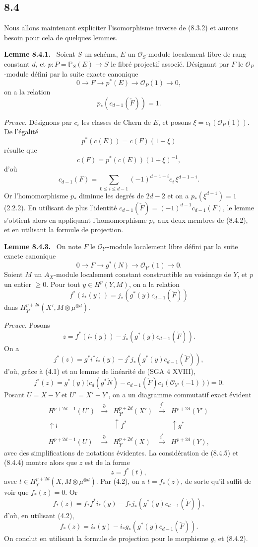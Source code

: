 \documentclass[11pt]{article}
\newenvironment{statement}[1]{\par\medskip\noindent\textbf{#1.}\ }{\par\medskip}
\begin{document}
\subsection*{8.4}

Nous allons maintenant expliciter l'isomorphisme inverse de (8.3.2) et aurons besoin pour cela de quelques lemmes.

\begin{statement}{Lemme 8.4.1}
Soient $S$ un schéma, $E$ un $\mathcal O_S$-module localement libre de rang constant $d$, et $p:P=\mathbb P_S(E)\to S$ le fibré projectif associé. Désignant par $F$ le $\mathcal O_P$-module défini par la suite exacte canonique
\[
0\to F\to p^*(E)\to\mathcal O_P(1)\to0,
\]
on a la relation
\[
p_*(c_{d-1}(\check F))=1.
\]
\end{statement}

\emph{Preuve.} Désignons par $c_i$ les classes de Chern de $E$, et posons $\xi=c_1(\mathcal O_P(1))$. De l'égalité
\[
p^*(c(E))=c(F)(1+\xi)
\]
résulte que
\[
c(F)=p^*(c(E))(1+\xi)^{-1},
\]
d'où
\[
c_{d-1}(F)=\sum_{0\le i\le d-1}(-1)^{d-1-i}c_i\,\xi^{d-1-i}.
\tag{8.4.2}
\]
Or l'homomorphisme $p_*$ diminue les degrés de $2d-2$ et on a $p_*(\xi^{d-1})=1$ (2.2.2). En utilisant de plus l'identité $c_{d-1}(\check F)=(-1)^{d-1}c_{d-1}(F)$, le lemme s'obtient alors en appliquant l'homomorphisme $p_*$ aux deux membres de (8.4.2), et en utilisant la formule de projection.

\begin{statement}{Lemme 8.4.3}
On note $F$ le $\mathcal O_{Y'}$-module localement libre défini par la suite exacte canonique
\[
0\to F\to g^*(N)\to\mathcal O_{Y'}(1)\to0.
\]
Soient $M$ un $A_X$-module localement constant constructible au voisinage de $Y$, et $p$ un entier $\ge0$. Pour tout $y\in H^p(Y,M)$, on a la relation
\[
f^*(i_*(y))=j_*(g^*(y)c_{d-1}(\check F))
\]
dans $H_{Y'}^{p+2d}(X',M\otimes\mu^{\otimes d})$.
\end{statement}

\emph{Preuve.} Posons
\[
z=f^*(i_*(y))-j_*(g^*(y)c_{d-1}(\check F)).
\]
On a
\[
j^*(z)=g^*i^*i_*(y)-j^*j_*(g^*(y)c_{d-1}(\check F)),
\]
d'où, grâce à (4.1) et au lemme de linéarité de (SGA 4 XVIII),
\[
j^*(z)=g^*(y)\bigl(c_d(g^*\check N)-c_{d-1}(\check F)c_1(\mathcal O_{Y'}(-1))\bigr)=0.
\tag{8.4.4}
\]
Posant $U=X-Y$ et $U'=X'-Y'$, on a un diagramme commutatif exact évident
\[
\begin{array}{ccccc}
H^{p+2d-1}(U')&\xrightarrow{\partial}&H^{p+2d}_{Y'}(X')&\xrightarrow{j^*}&H^{p+2d}(Y')\\
\uparrow\wr&&\uparrow f^*&&\uparrow g^*\\
H^{p+2d-1}(U)&\xrightarrow{\partial}&H_Y^{p+2d}(X)&\xrightarrow{i^*}&H^{p+2d}(Y),
\end{array}
\tag{8.4.5}
\]
avec des simplifications de notations évidentes. La considération de (8.4.5) et (8.4.4) montre alors que $z$ est de la forme
\[
z=f^*(t),
\]
avec $t\in H_Y^{p+2d}(X,M\otimes\mu^{\otimes d})$. Par (4.2), on a $t=f_*(z)$, de sorte qu'il suffit de voir que $f_*(z)=0$. Or
\[
f_*(z)=f_*f^*i_*(y)-f_*j_*(g^*(y)c_{d-1}(\check F)),
\]
d'où, en utilisant (4.2),
\[
f_*(z)=i_*(y)-i_*g_*(g^*(y)c_{d-1}(\check F)).
\]
On conclut en utilisant la formule de projection pour le morphisme $g$, et (8.4.2).
\end{document}

